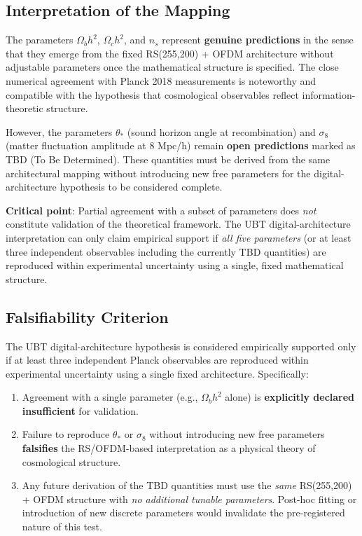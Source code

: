 \subsection{Interpretation of the Mapping}

The parameters $\Omega_b h^2$, $\Omega_c h^2$, and $n_s$ represent \textbf{genuine predictions} in the sense that they emerge from the fixed RS(255,200) + OFDM architecture without adjustable parameters once the mathematical structure is specified. The close numerical agreement with Planck 2018 measurements is noteworthy and compatible with the hypothesis that cosmological observables reflect information-theoretic structure.

However, the parameters $\theta_*$ (sound horizon angle at recombination) and $\sigma_8$ (matter fluctuation amplitude at 8 Mpc/h) remain \textbf{open predictions} marked as TBD (To Be Determined). These quantities must be derived from the same architectural mapping without introducing new free parameters for the digital-architecture hypothesis to be considered complete.

\textbf{Critical point}: Partial agreement with a subset of parameters does \emph{not} constitute validation of the theoretical framework. The UBT digital-architecture interpretation can only claim empirical support if \emph{all five parameters} (or at least three independent observables including the currently TBD quantities) are reproduced within experimental uncertainty using a single, fixed mathematical structure.

\subsection{Falsifiability Criterion}

The UBT digital-architecture hypothesis is considered empirically supported only if at least three independent Planck observables are reproduced within experimental uncertainty using a single fixed architecture. Specifically:

\begin{enumerate}
\item Agreement with a single parameter (e.g., $\Omega_b h^2$ alone) is \textbf{explicitly declared insufficient} for validation.
\item Failure to reproduce $\theta_*$ or $\sigma_8$ without introducing new free parameters \textbf{falsifies} the RS/OFDM-based interpretation as a physical theory of cosmological structure.
\item Any future derivation of the TBD quantities must use the \emph{same} RS(255,200) + OFDM structure with \emph{no additional tunable parameters}. Post-hoc fitting or introduction of new discrete parameters would invalidate the pre-registered nature of this test.
\end{enumerate}

